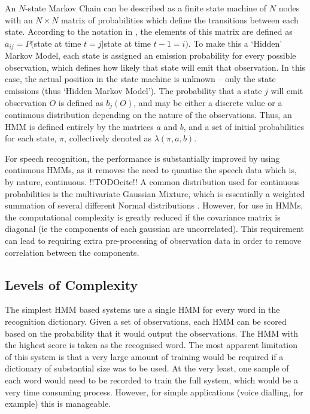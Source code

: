 	An $N$-state Markov Chain can be described as a finite state machine of $N$ nodes with an $N{\times}N$ matrix of probabilities which define the transitions between each state.  According to the notation in \cite{rabiner1989tutorial}, the elements of this matrix are defined as $a_{ij} = P($state at time $t = j |$state at time $t-1 = i)$.  To make this a `Hidden' Markov Model, each state is assigned an emission probability for every possible observation, which defines how likely that state will emit that observation.  In this case, the actual position in the state machine is unknown -- only the state emissions (thus `Hidden Markov Model').  The probability that a state $j$ will emit observation $O$ is defined as $b_j(O)$, and may be either a discrete value or a continuous distribution depending on the nature of the observations.  Thus, an HMM is defined entirely by the matrices $a$ and $b$, and a set of initial probabilities for each state, $\pi$, collectively denoted as $\lambda(\pi,a,b)$.

	For speech recognition, the performance is substantially improved by using continuous HMMs, as it removes the need to quantise the speech data which is, by nature, continuous. !!TODOcite!!  A common  distribution used for continuous probabilities is the multivariate Gaussian Mixture, which is essentially a weighted summation of several different Normal distributions \cite{bilmes2006hmms}.  However, for use in HMMs, the computational complexity is greatly reduced if the covariance matrix is diagonal (ie the components of each gaussian are uncorrelated).  This requirement can lead to requiring extra pre-processing of observation data in order to remove correlation between the components.

	\subsection{Levels of Complexity} %
	\label{sub:levels_of_complexity}
		The simplest HMM based systems use a single HMM for every word in the recognition dictionary.  Given a set of observations, each HMM can be scored based on the probability that it would output the observations.  The HMM with the highest score is taken as the recognised word.  The most apparent limitation of this system is that a very large amount of training would be required if a dictionary of substantial size was to be used.  At the very least, one sample of each word would need to be recorded to train the full system, which would be a very time consuming process.  However, for simple applications (voice dialling, for example) this is manageable.

